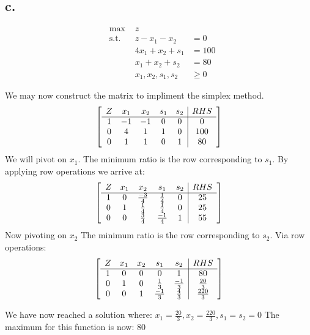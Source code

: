 \documentclass[10pt, letterpaper]{paper}
\begin{document}
\subsection*{c.}
\begin{equation*}
\begin{alignedat}{3}
&\text{max }&z&\\
&\text{s.t. } &z - x_1 - x_2 &= 0 \\
& &4x_1 + x_2 + s_1 &= 100\\
& &x_1 + x_2 + s_2 &= 80\\
& &x_1, x_2, s_1, s_2 &\geq 0
\end{alignedat}
\end{equation*}

We may now construct the matrix to impliment the simplex method.
\[
	\left[ {\begin{array}{ccccc|c}
	Z & x_1 & x_2 & s_1 & s_2 & RHS\\ \cline{1-6}
	1 & -1 & -1 & 0 & 0 & 0 \\
	0 & 4 & 1 & 1 & 0 & 100 \\
	0 & 1 & 1 & 0 & 1 & 80 \\
	\end{array} } \right]
\]
We will pivot on $x_1$. The minimum ratio is the row corresponding to $s_1$. By applying row operations we arrive at:
\[
	\left[ {\begin{array}{ccccc|c}
	Z & x_1 & x_2 & s_1 & s_2 & RHS\\ \cline{1-6}
	1 & 0 & \frac{-3}{4} & \frac{1}{4} & 0 & 25 \\
	0 & 1 & \frac{1}{4} & \frac{1}{4} & 0 & 25 \\
	0 & 0 & \frac{3}{4} & \frac{-1}{4} & 1 & 55 \\
	\end{array} } \right]
\]
Now pivoting on $x_2$ The minimum ratio is the row corresponding to $s_2$. Via row operations:
\[
	\left[ {\begin{array}{ccccc|c}
	Z & x_1 & x_2 & s_1 & s_2 & RHS\\ \cline{1-6}
	1 & 0 & 0 & 0 & 1 & 80 \\
	0 & 1 & 0 & \frac{1}{3} & \frac{-1}{3} & \frac{20}{3} \\
	0 & 0 & 1 & \frac{-1}{3} & \frac{4}{3} & \frac{220}{3} \\
	\end{array} } \right]
\]

We have now reached a solution where: $x_1 = \frac{20}{3}, x_2 = \frac{220}{3}, s_1 = s_2 = 0$
The maximum for this function is now: 80
\end{document}
